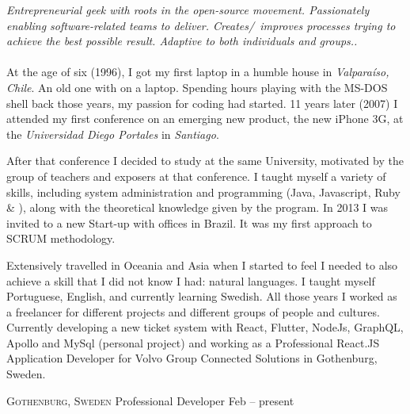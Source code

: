 \documentclass[10pt,a4paper]{article}
\begin{document}
\vspace{-1.3em}  %
\begin{multicols}{2}  %
\noindent \emph{Entrepreneurial geek with roots in the open-source movement. Passionately enabling software-related teams to deliver. Creates/\ improves processes trying to achieve the best possible result. Adaptive to both individuals and groups..}
\\
\\
At the age of six (1996), I got my first laptop in a humble house in \emph{Valparaíso, Chile}.  An old one with  on a  laptop. Spending hours playing with the MS-DOS shell back those years, my passion for coding had started. 11 years later (2007) I attended my first conference on an emerging new product, the new iPhone 3G, at the \emph{Universidad Diego Portales} in \emph{Santiago}.

After that conference I decided to study at the same University, motivated by the group of teachers and exposers at that conference. I taught myself a variety of skills, including system administration and programming (Java, Javascript, Ruby \& \CPP), along with the theoretical knowledge given by the program. In 2013 I was invited to a new Start-up with offices in Brazil. It was my first approach to SCRUM methodology.

Extensively travelled in Oceania and Asia when I started to feel I needed to also achieve a skill that I did not know I had: natural languages. I taught myself Portuguese, English, and currently learning Swedish. All those years I  worked as a freelancer for different projects and different groups of people and cultures. Currently developing a new ticket system with React, Flutter, NodeJs, GraphQL, Apollo and MySql (personal project) and working as a Professional React.JS Application Developer for Volvo Group Connected Solutions in Gothenburg, Sweden.



\end{multicols}


\spacedhrule{0em}{-0.4em}


\headedsection
  {\href{https://www.volvogroup.com/en/about-us/organization/other-entities/volvo-group-connected-solutions.html}{}}
  {\textsc{Gothenburg, Sweden}} {%
  \headedsubsection
    {Professional  Developer}
    {Feb  -- present}
    {}
}
\end{document}
